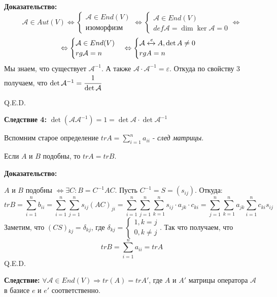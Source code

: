 \textbf{Доказательство:}
$$\mathcal{A} \in Aut(V) \Leftrightarrow \begin{cases}
    \mathcal{A} \in End(V) \\
    \text{изоморфизм}
\end{cases} \Leftrightarrow \begin{cases}
    \mathcal{A} \in End(V)\\
    def \mathcal{A} = \dim \ker \mathcal{A} = 0
\end{cases} \Leftrightarrow $$
$$\Leftrightarrow\begin{cases}
    \mathcal{A}\in End(V) \\
    rg \mathcal{A} = n
\end{cases} \Leftrightarrow \begin{cases}
    \mathcal{A} \xleftrightarrow{e} A,\det A \neq 0 \\
    rg A = n
\end{cases}$$
Мы знаем, что существует $\mathcal{A}^{-1}$. А также $\mathcal{A}\cdot \mathcal{A}^{-1}=\varepsilon$. Откуда по свойству 3 получаем, что $\det \mathcal{A}^{-1} = \cfrac{1}{\det \mathcal{A}}$

\hfill Q.E.D.

\textbf{Следствие 4:} $\det( \mathcal{A} \mathcal{A}^{-1})= 1 = \det  \mathcal{A} \cdot \det \mathcal{A}^{-1}$


Вспомним старое определение $tr A = \sum\limits_{i=1}^n a_{ii}$ - \emph{след матрицы}.


Если $A$ и $B$ подобны, то $tr A = tr B$.

\textbf{Доказательство:}

$A$ и $B$ подобны $\Leftrightarrow\exists C :B =C^{-1}AC$. Пусть $C^{-1} = S = (s_{ij})$. Откуда:
$$tr B = \sum\limits_{i=1}^n b_{ii} = \sum\limits_{i=1}^n \sum\limits_{j=1}^ns_{ij} (AC)_{ji} = \sum\limits_{i=1}^n \sum\limits_{j=1}^n \sum\limits_{k=1}^n s_{ij}\cdot a_{jk} \cdot c_{ki} = \sum\limits_{j=1}^n\sum\limits_{k=1}^n a_{jk}\sum\limits_{i=1}^nc_{ki}s_{ij}$$
Заметим, что $(CS)_{kj} = \delta_{kj}$, где $\delta_{kj}=\begin{cases}
    1, k=j\\
    0, k\neq j
\end{cases}$. Так что получаем, что 
$$tr B = \sum\limits_{i=1}^n a_{ii} = tr A$$
\hfill Q.E.D.

\textbf{Следствие:} $\forall \mathcal{A} \in End(V) \Rightarrow tr(A) = tr A'$, где $A$ и $A'$ матрицы оператора $\mathcal{A}$ в базисе $e$ и $e'$ соответственно.

